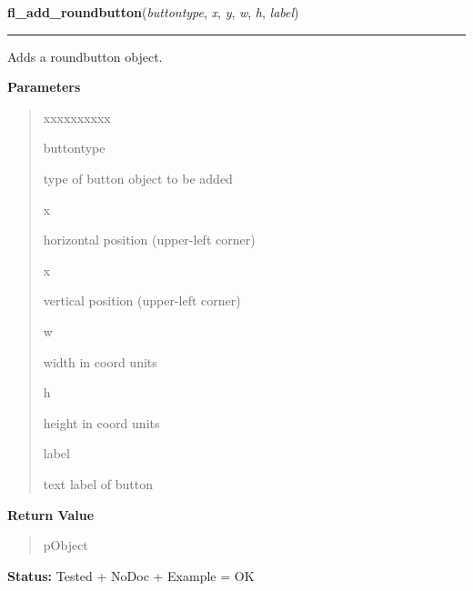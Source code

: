     \label{xformslib:library:fl_add_roundbutton}

    \vspace{0.5ex}

\hspace{.8\funcindent}\begin{boxedminipage}{\funcwidth}

    \raggedright \textbf{fl\_add\_roundbutton}(\textit{buttontype}, \textit{x}, \textit{y}, \textit{w}, \textit{h}, \textit{label})

    \vspace{-1.5ex}

    \rule{\textwidth}{0.5\fboxrule}
\setlength{\parskip}{2ex}
    Adds a roundbutton object.

\setlength{\parskip}{1ex}
      \textbf{Parameters}
      \vspace{-1ex}

      \begin{quote}
        \begin{Ventry}{xxxxxxxxxx}

          \item[buttontype]

          type of button object to be added

          \item[x]

          horizontal position (upper-left corner)

          \item[x]

          vertical position (upper-left corner)

          \item[w]

          width in coord units

          \item[h]

          height in coord units

          \item[label]

          text label of button

        \end{Ventry}

      \end{quote}

      \textbf{Return Value}
    \vspace{-1ex}

      \begin{quote}
      pObject

      \end{quote}

\textbf{Status:} Tested + NoDoc + Example = OK



    \end{boxedminipage}

